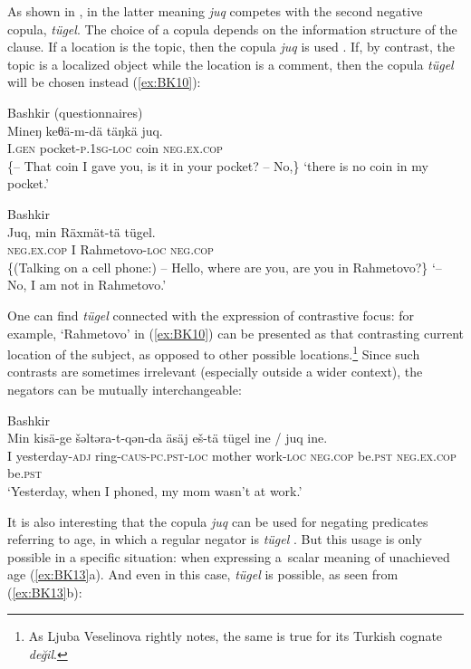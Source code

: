 \documentclass[output=paper]{langsci/langscibook}
\begin{document}
As shown in \citet{mishchenko2017a}, in the latter meaning \textit{juq} competes with the second negative copula, \textit{tügel}. The choice of a copula depends on the information structure of the clause. If a location is the topic, then the copula \textit{juq} is used . If, by contrast, the topic is a localized object while the location is a comment, then the copula \textit{tügel} will be chosen instead (\ref{ex:BK10}):

\ea Bashkir (questionnaires) \label{ex:BK9}\\
	\gll Mineŋ		keθä-m-dä				täŋkä		juq.\\
	I.\textsc{gen}		pocket-\textsc{p.1sg-loc}	coin		\textsc{neg.ex.cop}\\
	\glt \{– That coin I gave you, is it in your pocket? – No,\} `there is no coin in my pocket.'
\z

\ea Bashkir \citep[138]{mishchenko2017a} \label{ex:BK10}\\
	\gll Juq,			min	Räxmät-tä			tügel.\\
	\textsc{neg.ex.cop}	I		Rahmetovo-\textsc{loc}	\textsc{neg.cop}\\
	\glt \{(Talking on a cell phone:) – Hello, where are you, are you in Rahmetovo?\} `– No, I am not in Rahmetovo.'
\z


One can find \textit{tügel} connected with the expression of contrastive focus: for example, ‘Rahmetovo’ in (\ref{ex:BK10}) can be presented as that contrasting current location of the subject, as opposed to other possible locations.\footnote{As Ljuba Veselinova rightly notes, the same is true for its Turkish cognate \textit{değil}.} Since such contrasts are sometimes irrelevant (especially outside a wider context), the negators can be mutually interchangeable:

\ea Bashkir \citep[138]{mishchenko2017a} \label{ex:BK11}\\
	\gll Min	kisä-ge			šəltəra-t-qən-da			äsäj    eš-tä			tügel			ine		{/ juq}				ine.\\
	I		yesterday-\textsc{adj}	ring-\textsc{caus-pc.pst-loc}	mother  work-\textsc{loc}	\textsc{neg.cop}		be.\textsc{pst}	\textsc{neg.ex.cop}		be.\textsc{pst}\\
	\glt `Yesterday, when I phoned, my mom wasn’t at work.'
\z

It is also interesting that the copula \textit{juq} can be used for negating predicates referring to age, in which a regular negator is \textit{tügel} . But this usage is only possible in a specific situation: when expressing a scalar meaning of unachieved age (\ref{ex:BK13}a). And even in this case, \textit{tügel} is possible, as seen from (\ref{ex:BK13}b):
\end{document}
